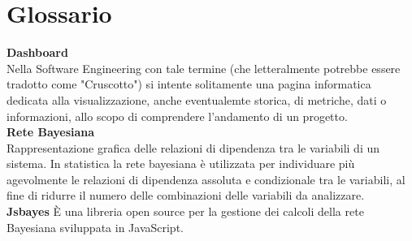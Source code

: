 \section{Glossario}\label{glox}

\textbf{Dashboard} \-\\
Nella Software Engineering con tale termine (che letteralmente potrebbe essere tradotto come "Cruscotto") si intente solitamente una pagina informatica dedicata
alla visualizzazione, anche eventualemte storica, di metriche, dati o informazioni, allo scopo di comprendere l'andamento di un progetto.\-\\

\textbf{Rete Bayesiana} \-\\
Rappresentazione grafica delle relazioni di dipendenza tra le variabili di un sistema. In statistica la rete bayesiana è utilizzata per individuare più agevolmente le relazioni di dipendenza assoluta e condizionale tra le variabili, al fine di ridurre il numero delle combinazioni delle variabili da analizzare.\-\\

\textbf{Jsbayes}
È una libreria open source per la gestione dei calcoli della rete Bayesiana sviluppata in JavaScript.\-\\
